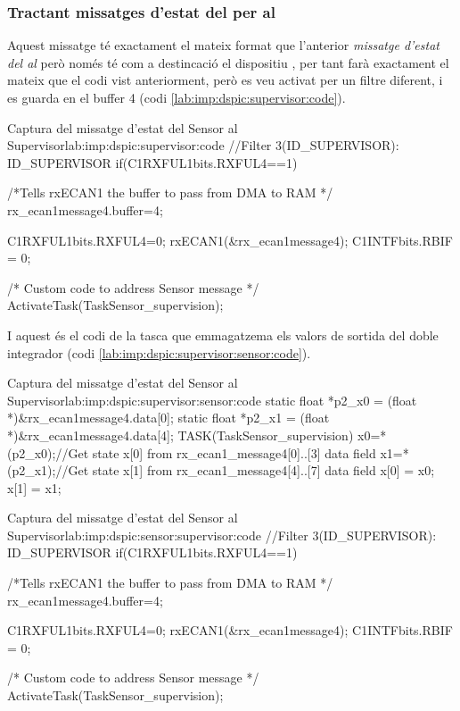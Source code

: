 \subsubsection{Tractant missatges d'estat del \Sensor per al \Supervisor}\label{lab:imp:dspic:ID_SUPERVISOR}

Aquest missatge té exactament el mateix format que l'anterior \emph{missatge d'estat del \Sensor al \Controlador} però només té com a destincació el dispositiu \Monitor, per tant farà exactament el mateix que el codi vist anteriorment, però es veu activat per un filtre diferent, i es guarda en el buffer 4 (codi \ref{lab:imp:dspic:supervisor:code}).

\begin{code_c}{Captura del missatge d'estat del Sensor al Supervisor}{lab:imp:dspic:supervisor:code}
//Filter 3(ID_SUPERVISOR): ID_SUPERVISOR
if(C1RXFUL1bits.RXFUL4==1)
{
	/*Tells rxECAN1 the buffer to pass from DMA to RAM */
	rx_ecan1message4.buffer=4;

	C1RXFUL1bits.RXFUL4=0;
	rxECAN1(&rx_ecan1message4);
	C1INTFbits.RBIF = 0;

	/* Custom code to address Sensor message */
	ActivateTask(TaskSensor_supervision);
}
\end{code_c}

I aquest és el codi de la tasca que emmagatzema els valors de sortida del doble integrador (codi \ref{lab:imp:dspic:supervisor:sensor:code}).

\begin{code_c}{Captura del missatge d'estat del Sensor al Supervisor}{lab:imp:dspic:supervisor:sensor:code}
static float *p2_x0 = (float *)&rx_ecan1message4.data[0];
static float *p2_x1 = (float *)&rx_ecan1message4.data[4];
TASK(TaskSensor_supervision)
{
	x0=*(p2_x0);//Get state x[0] from rx_ecan1_message4[0]..[3] data field
	x1=*(p2_x1);//Get state x[1] from rx_ecan1_message4[4]..[7] data field
	x[0] = x0;
	x[1] = x1;
}
\end{code_c}

\begin{code_c}{Captura del missatge d'estat del Sensor al Supervisor}{lab:imp:dspic:sensor:supervisor:code}
//Filter 3(ID_SUPERVISOR): ID_SUPERVISOR
if(C1RXFUL1bits.RXFUL4==1)
{
	/*Tells rxECAN1 the buffer to pass from DMA to RAM */
	rx_ecan1message4.buffer=4;

	C1RXFUL1bits.RXFUL4=0;
	rxECAN1(&rx_ecan1message4);
	C1INTFbits.RBIF = 0;

	/* Custom code to address Sensor message */
	ActivateTask(TaskSensor_supervision);
}
\end{code_c}

